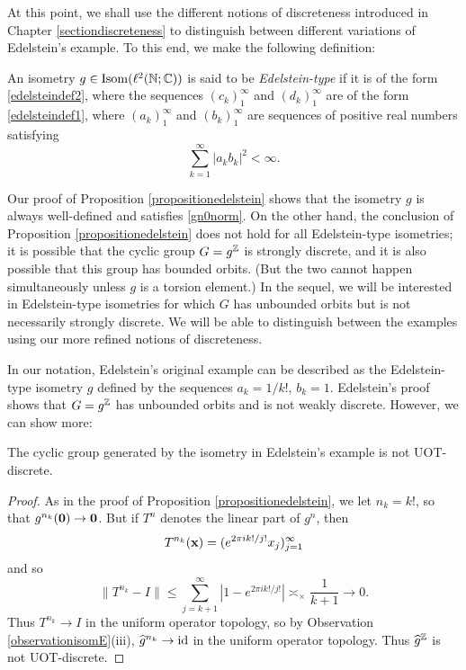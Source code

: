 At this point, we shall use the different notions of discreteness introduced in Chapter \ref{sectiondiscreteness} to distinguish between different variations of Edelstein's example. To this end, we make the following definition:

\begin{definition}
\label{definitionedelstein}
An isometry $g\in\Isom(\ell^2(\N;\C))$ is said to be \emph{Edelstein-type} if it is of the form \eqref{edelsteindef2}, where the sequences $(c_k)_1^\infty$ and $(d_k)_1^\infty$ are of the form \eqref{edelsteindef1}, where $(a_k)_1^\infty$ and $(b_k)_1^\infty$ are sequences of positive real numbers satisfying
\[
\sum_{k = 1}^\infty |a_k b_k|^2 < \infty.
\]
\end{definition}

Our proof of Proposition \ref{propositionedelstein} shows that the isometry $g$ is always well-defined and satisfies \eqref{gn0norm}. On the other hand, the conclusion of Proposition \ref{propositionedelstein} does not hold for all Edelstein-type isometries; it is possible that the cyclic group $G = g^\Z$ is strongly discrete, and it is also possible that this group has bounded orbits. (But the two cannot happen simultaneously unless $g$ is a torsion element.) In the sequel, we will be interested in Edelstein-type isometries for which $G$ has unbounded orbits but is not necessarily strongly discrete. We will be able to distinguish between the examples using our more refined notions of discreteness.

\begin{edelsteinexample}
\label{exampleedelstein}
In our notation, Edelstein's original example can be described as the Edelstein-type isometry $g$ defined by the sequences $a_k = 1/k!$, $b_k = 1$. Edelstein's proof shows that $G = g^\Z$ has unbounded orbits and is not weakly discrete. However, we can show more:
\end{edelsteinexample}
\begin{proposition}
\label{propositionedelsteinUOT}
The cyclic group generated by the isometry in Edelstein's example is not UOT-discrete.
\end{proposition}
\begin{proof}
As in the proof of Proposition \ref{propositionedelstein}, we let $n_k = k!$, so that $g^{n_k}(\mathbf 0)\to \mathbf 0$. But if $T^n$ denotes the linear part of $g^n$, then
\[
T^{n_k}(\mathbf x) = (e^{2\pi i k!/j!} x_j)_{j = 1}^\infty
\]
and so
\[
\|T^{n_k} - I\| \leq \sum_{j = k + 1}^\infty |1 - e^{2\pi i k!/j!}| \asymp_\times \frac{1}{k + 1} \to 0.
\]
Thus $T^{n_k}\to I$ in the uniform operator topology, so by Observation \ref{observationisomE}(iii), $\widehat g^{n_k}\to\mathrm{id}$ in the uniform operator topology. Thus $\what g^\Z$ is not UOT-discrete.
\end{proof}

